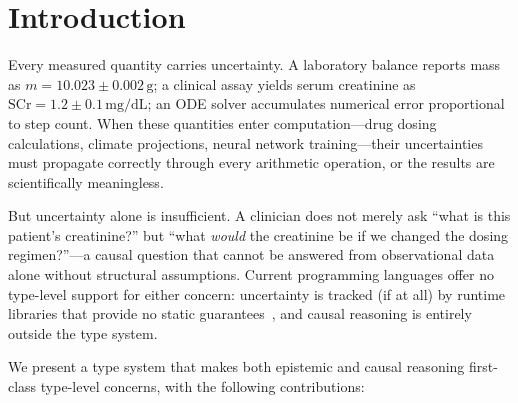 \documentclass[acmsmall,screen,review,anonymous]{acmart}
\begin{document}


\maketitle

\section{Introduction}
\label{sec:intro}

Every measured quantity carries uncertainty.
A laboratory balance reports mass as $m = 10.023 \pm 0.002\,\text{g}$;
a clinical assay yields serum creatinine as $\text{SCr} = 1.2 \pm 0.1\,\text{mg/dL}$;
an ODE solver accumulates numerical error proportional to step count.
When these quantities enter computation---drug dosing calculations,
climate projections, neural network training---their uncertainties must
propagate correctly through every arithmetic operation,
or the results are scientifically meaningless.

But uncertainty alone is insufficient.
A clinician does not merely ask ``what is this patient's creatinine?''
but ``what \emph{would} the creatinine be if we changed the dosing
regimen?''---a causal question that cannot be answered from
observational data alone without structural assumptions.
Current programming languages offer no type-level support for either
concern: uncertainty is tracked (if at all) by runtime libraries
that provide no static guarantees~\cite{lebigot2024uncertainties,
giordano2016measurements}, and causal reasoning is entirely
outside the type system.

We present a type system that makes both epistemic and causal
reasoning first-class type-level concerns, with the following
contributions:
\end{document}

